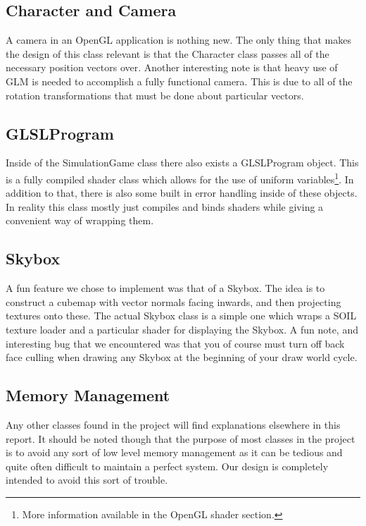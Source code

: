 \documentclass[paper=a4, fontsize=11pt]{scrartcl}
\numberwithin{equation}{section}		%
\numberwithin{figure}{section}			%
\numberwithin{table}{section}				%
\begin{document}
\subsection{Character and Camera}
A camera in an OpenGL application is nothing new. The only thing that makes the design of this class relevant is that the Character class passes all of the necessary position vectors over. Another interesting note is that heavy use of GLM is needed to accomplish a fully functional camera. This is due to all of the rotation transformations that must be done about particular vectors.
\subsection{GLSLProgram}
Inside of the SimulationGame class there also exists a GLSLProgram object. This is a fully compiled shader class which allows for the use of uniform variables\footnote{More information available in the OpenGL shader section.}. In addition to that, there is also some built in error handling inside of these objects. In reality this class mostly just compiles and binds shaders while giving a convenient way of wrapping them.
\subsection{Skybox}
A fun feature we chose to implement was that of a Skybox. The idea is to construct a cubemap with vector normals facing inwards, and then projecting textures onto these. The actual Skybox class is a simple one which wraps a SOIL texture loader and a particular shader for displaying the Skybox. A fun note, and interesting bug that we encountered was that you of course must turn off back face culling when drawing any Skybox at the beginning of your draw world cycle.
\subsection{Memory Management}
Any other classes found in the project will find explanations elsewhere in this report. It should be noted though that the purpose of most classes in the project is to avoid any sort of low level memory management as it can be tedious and quite often difficult to maintain a perfect system. Our design is completely intended to avoid this sort of trouble.



\end{document}

